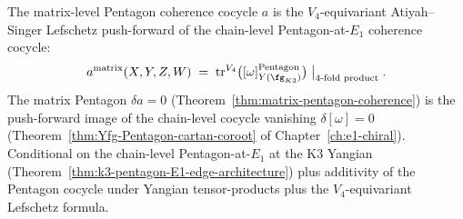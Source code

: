 \begin{theorem}
\label{thm:chain-to-matrix-pentagon-unification}
The matrix-level Pentagon coherence cocycle $a$ is the
$V_4$-equivariant Atiyah--Singer Lefschetz push-forward of the
chain-level Pentagon-at-$E_1$ coherence cocycle:
\[
 a^{\mathrm{matrix}}(X, Y, Z, W)
 \;=\; \mathrm{tr}^{V_4}\bigl([\omega]^{\mathrm{Pentagon}}_{Y(\fg_{K3})}\bigr)
 \bigm|_{\text{4-fold product}}.
\]
The matrix Pentagon $\delta a = 0$
\textup{(}Theorem~\ref{thm:matrix-pentagon-coherence}\textup{)} is the
push-forward image of the chain-level cocycle vanishing
$\delta [\omega] = 0$
\textup{(}Theorem~\ref{thm:Yfg-Pentagon-cartan-coroot} of
Chapter~\ref{ch:e1-chiral}\textup{).} Conditional on the
chain-level Pentagon-at-$E_1$ at the K$3$ Yangian
\textup{(}Theorem~\ref{thm:k3-pentagon-E1-edge-architecture}\textup{)}
plus additivity of the Pentagon cocycle under Yangian tensor-products
plus the $V_4$-equivariant Lefschetz formula.
\end{theorem}

